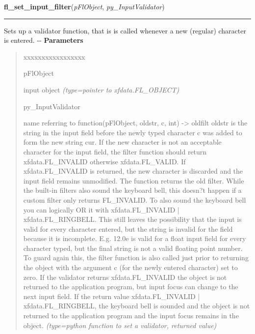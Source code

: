 \hspace{.8\funcindent}\begin{boxedminipage}{\funcwidth}

    \raggedright \textbf{fl\_set\_input\_filter}(\textit{pFlObject}, \textit{py\_InputValidator})

    \vspace{-1.5ex}

    \rule{\textwidth}{0.5\fboxrule}
\setlength{\parskip}{2ex}

Sets up a validator function, that is is called whenever a new
(regular) character is entered.
-{}-
\setlength{\parskip}{1ex}
      \textbf{Parameters}
      \vspace{-1ex}

      \begin{quote}
        \begin{Ventry}{xxxxxxxxxxxxxxxxx}

          \item[pFlObject]


input object
            {\it (type=pointer to xfdata.FL\_OBJECT)}

          \item[py\_InputValidator]


name referring to function(pFlObject, oldstr, c, int) -> oldfilt
oldstr is the string in the input field before the newly typed
character c was added to form the new string cur. If the new character
is not an acceptable character for the input field, the filter
function should return xfdata.FL\_INVALID otherwise xfdata.FL\_VALID.
If xfdata.FL\_INVALID is returned, the new character is discarded and
the input field remains unmodified. The function returns the old
filter. While the built-in filters also sound the keyboard bell, this
doesn?t happen if a custom filter only returns FL\_INVALID. To also
sound the keyboard bell you can logically OR it with xfdata.FL\_INVALID
| xfdata.FL\_RINGBELL. This still leaves the possibility that the
input is valid for every character entered, but the string is invalid
for the field because it is incomplete. E.g. 12.0e is valid for a
float input field for every character typed, but the final string is
not a valid floating point number. To guard again this, the filter
function is also called just prior to returning the object with the
argument c (for the newly entered character) set to zero. If the
validator returns xfdata.FL\_INVALID the object is not returned to the
application program, but input focus can change to the next input
field. If the return value xfdata.FL\_INVALID | xfdata.FL\_RINGBELL,
the keyboard bell is sounded and the object is not returned to the
application program and the input focus remains in the object.
            {\it (type=python function to set a validator, returned value)}


\end{Ventry}
\end{quote}
\end{boxedminipage}

